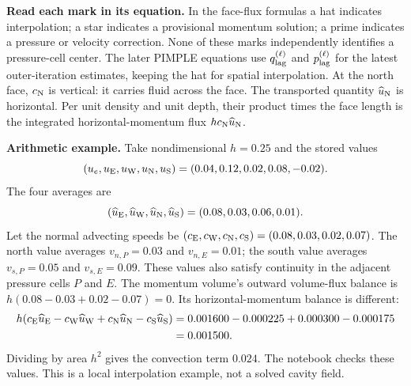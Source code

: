 \textbf{Read each mark in its equation.} In the face-flux formulas a hat indicates interpolation; a star indicates
a provisional momentum solution; a prime indicates a pressure or velocity
correction. None of these marks independently identifies a pressure-cell center.
The later PIMPLE equations use $q_{\rm lag}^{(\ell)}$ and
$p_{\rm lag}^{(\ell)}$ for the latest outer-iteration estimates, keeping the hat
for spatial interpolation.
\newpage
{}
At the north face, $c_{\rm N}$ is vertical: it carries fluid across the face.
The transported quantity $\widehat u_{\rm N}$ is horizontal. Per unit density
and unit depth, their product times the face length is the integrated
horizontal-momentum flux $h c_{\rm N}\widehat u_{\rm N}$.

\textbf{Arithmetic example.} Take nondimensional $h=0.25$ and the stored values
\[
(u_e,u_{\rm E},u_{\rm W},u_{\rm N},u_{\rm S})
=(0.04,0.12,0.02,0.08,-0.02).
\]
The four averages are
\[
(\widehat u_{\rm E},\widehat u_{\rm W},\widehat u_{\rm N},\widehat u_{\rm S})
=(0.08,0.03,0.06,0.01).
\]
Let the normal advecting speeds be $(c_{\rm E},c_{\rm W},c_{\rm N},c_{\rm S})
=(0.08,0.03,0.02,0.07)$. The north value averages $v_{n,P}=0.03$ and
$v_{n,E}=0.01$; the south value averages $v_{s,P}=0.05$ and $v_{s,E}=0.09$.
These values also satisfy continuity in the adjacent pressure cells $P$ and $E$.
The momentum volume's outward volume-flux balance is
$h(0.08-0.03+0.02-0.07)=0$. Its horizontal-momentum balance is different:
\begin{align*}
h(c_{\rm E}\widehat u_{\rm E}-c_{\rm W}\widehat u_{\rm W}
+c_{\rm N}\widehat u_{\rm N}-c_{\rm S}\widehat u_{\rm S})
&=0.001600-0.000225+0.000300-0.000175\\
&=0.001500.
\end{align*}
Dividing by area $h^2$ gives the convection term $0.024$. The notebook checks
these values. This is a local interpolation example, not a solved cavity field.
